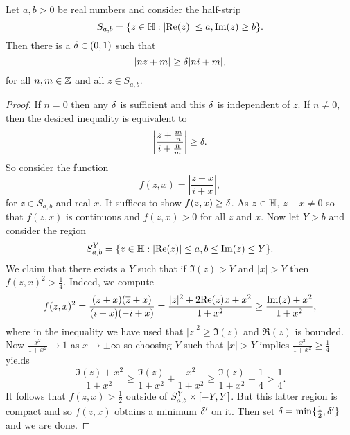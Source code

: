       \begin{lemma}\label{lem:technical_Eisenstein_convergence_lemma}
        Let $a,b > 0$ be real numbers and consider the half-strip
        \[
          S_{a,b} = \{z \in \mathbb{H}:|\mathrm{Re}(z)| \le a, \mathrm{Im}(z) \ge b\}.
        \]
        Then there is a $\delta \in (0,1)$ such that
        \[
          |nz+m| \ge \delta|ni+m|,
        \]
        for all $n,m \in \mathbb{Z}$ and all $z \in S_{a,b}$.
      \end{lemma}
      \begin{proof}
        If $n = 0$ then any $\delta$ is sufficient and this $\delta$ is independent of $z$. If $n \neq 0$, then the desired inequality is equivalent to
        \[
          \left|\frac{z+\frac{m}{n}}{i+\frac{n}{m}}\right| \ge \delta.
        \]
        So consider the function
        \[
          f(z,x) = \left|\frac{z+x}{i+x}\right|,
        \]
        for $z \in S_{a,b}$ and real $x$. It suffices to show $f(z,x) \ge \delta$. As $z \in \mathbb{H}$, $z-x \neq 0$ so that $f(z,x)$ is continuous and $f(z,x) > 0$ for all $z$ and $x$. Now let $Y > b$ and consider the region
        \[
          S_{a,b}^{Y} = \{z \in \mathbb{H}:|\mathrm{Re}(z)| \le a, b \le \mathrm{Im}(z) \le Y\}.
        \]
        We claim that there exists a $Y$ such that if $\Im(z) > Y$ and $|x| > Y$ then $f(z,x)^{2} > \frac{1}{4}$. Indeed, we compute
        \[
          f(z,x)^{2} = \frac{(z+x)(\overline{z}+x)}{(i+x)(-i+x)} = \frac{|z|^{2}+2\mathrm{Re}(z)x+x^{2}}{1+x^{2}} \ge \frac{\mathrm{Im}(z)+x^{2}}{1+x^{2}},
        \]
        where in the inequality we have used that $|z|^{2} \ge \Im(z)$ and $\Re(z)$ is bounded. Now $\frac{x^{2}}{1+x^{2}} \to 1$ as $x \to \pm\infty$ so choosing $Y$ such that $|x| > Y$ implies $\frac{x^{2}}{1+x^{2}} \ge \frac{1}{4}$ yields
        \[
          \frac{\Im(z)+x^{2}}{1+x^{2}} \ge \frac{\Im(z)}{1+x^{2}}+\frac{x^{2}}{1+x^{2}} \ge \frac{\Im(z)}{1+x^{2}}+\frac{1}{4} > \frac{1}{4}.
        \]
        It follows that $f(z,x) > \frac{1}{2}$ outside of $S_{a,b}^{Y} \times [-Y,Y]$. But this latter region is compact and so $f(z,x)$ obtains a minimum $\delta'$ on it. Then set $\delta = \min\{\frac{1}{2},\delta'\}$ and we are done.
      \end{proof}

